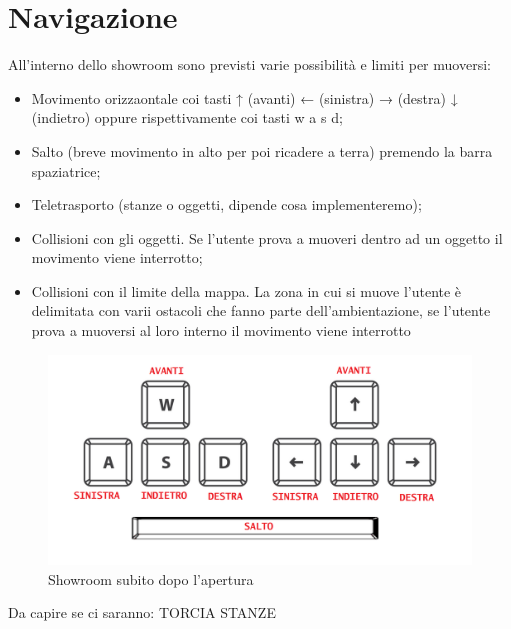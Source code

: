\section{Navigazione}
All'interno dello showroom sono previsti varie possibilità e limiti per muoversi:
\begin{itemize}
	\item Movimento orizzaontale coi tasti ↑ (avanti) ← (sinistra) → (destra) ↓ (indietro) oppure rispettivamente coi tasti w a s d;
	\item Salto (breve movimento in alto per poi ricadere a terra) premendo la barra spaziatrice;
	\item Teletrasporto (stanze o oggetti, dipende cosa implementeremo);
	\item Collisioni con gli oggetti. Se l'utente prova a muoveri dentro ad un oggetto il movimento viene interrotto;
	\item Collisioni con il limite della mappa. La zona in cui si muove l'utente è delimitata con varii ostacoli che fanno parte dell'ambientazione, se l'utente prova a muoversi al loro interno il movimento viene interrotto
\end{itemize}
\begin{figure}[H]
  \renewcommand{\thefigure}{2}
  \includegraphics[width=\linewidth]{./res/images/comandi_direzionali.png}
  \caption{Showroom subito dopo l'apertura}
  \label{Showroom subito dopo l'apertura}
\end{figure}
\pagebreak



Da capire se ci saranno:
TORCIA
STANZE


